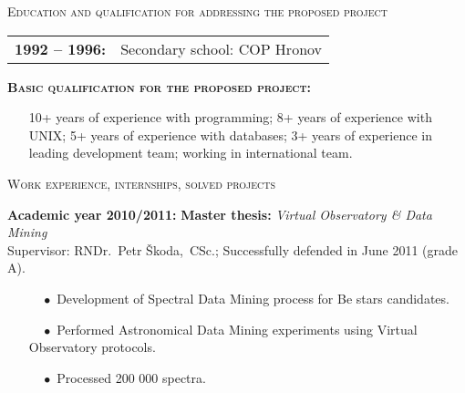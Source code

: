 \documentclass[10pt]{article}
\begin{document}
\begin{cv}
\begin{cvlist}{\large \textsc{Education and qualification for addressing the proposed project}}
  \item \begin{tabular}{p{2.8cm}p{11cm}}
   {\bf{1992 -- 1996:}} & Secondary school: COP Hronov
   \end{tabular}
   
   \item {\bf{\textsc{Basic qualification for the proposed
         project:}}} \begin{itemize}
    \item[] \vspace{-0.3cm} 10+ years of experience with programming; 8+
      years of experience with UNIX; 5+ years of experience with
      databases; 3+ years of experience in leading development team;
      working in international team.

   \end{itemize}  
\end{cvlist}






\noindent\hrulefill
\begin{cvlist}{\large \textsc{Work experience, internships, solved projects}}

\item {\bf{Academic year 2010/2011:}} \textbf{Master thesis:}
  \textit{Virtual Observatory \& Data Mining}\\Supervisor: RNDr.~Petr Škoda,~CSc.; Successfully defended in June 2011 (grade A).
\vspace{-0.3cm}
\begin{itemize}
\item[$\quad \bullet$ \hspace{-1.5mm}] Development of Spectral Data
  Mining process for Be stars candidates.
\item[$\quad \bullet$ \hspace{-1.5mm}] Performed Astronomical Data
  Mining experiments using Virtual Observatory protocols.
\item[$\quad \bullet$ \hspace{-1.5mm}] Processed 200 000 spectra.



\end{itemize}
\end{cvlist}
\end{cv}
\end{document}
